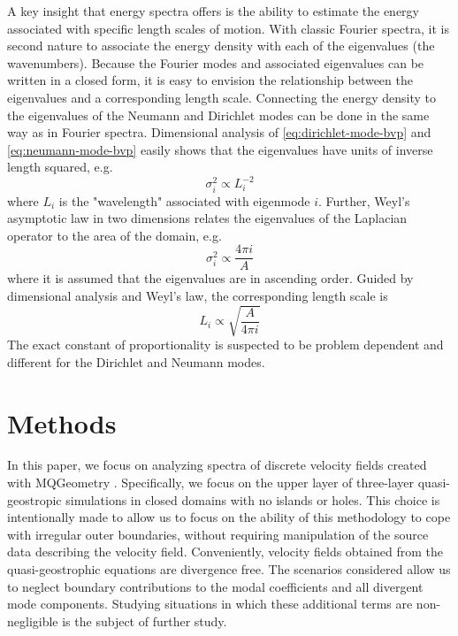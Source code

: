 \documentclass[draft]{agujournal2019}
\begin{document}
A key insight that energy spectra offers is the ability to estimate the energy associated with specific length scales of motion. With classic Fourier spectra, it is second nature to associate the energy density with each of the eigenvalues (the wavenumbers). Because the Fourier modes and associated eigenvalues can be written in a closed form, it is easy to envision the relationship between the eigenvalues and a corresponding length scale. Connecting the energy density to the eigenvalues of the Neumann and Dirichlet modes can be done in the same way as in Fourier spectra. Dimensional analysis of \eqref{eq:dirichlet-mode-bvp} and \eqref{eq:neumann-mode-bvp} easily shows that the eigenvalues have units of inverse length squared, e.g. 
\begin{equation}
    \sigma_i^2 \propto L_i^{-2}
\end{equation}
where $L_i$ is the "wavelength" associated with eigenmode $i$. Further, Weyl's asymptotic law \cite{Weyl1911,Weyl1912,Grebenkov_2013} in two dimensions relates the eigenvalues of the Laplacian operator to the area of the domain, e.g.
\begin{equation}
    \sigma_i^2 \propto \frac{4\pi i}{A}
\end{equation}
where it is assumed that the eigenvalues are in ascending order. Guided by dimensional analysis and Weyl's law, the corresponding length scale is
\begin{equation}
    L_i \propto \sqrt{\frac{A}{4\pi i}}
\end{equation}
The exact constant of proportionality is suspected to be problem dependent and different for the Dirichlet and Neumann modes. 

\section{Methods}
In this paper, we focus on analyzing spectra of discrete velocity fields created with MQGeometry \cite{Thiry2024}. Specifically, we focus on the upper layer of three-layer quasi-geostropic simulations in closed domains with no islands or holes. This choice is intentionally made to allow us to focus on the ability of this methodology to cope with irregular outer boundaries, without requiring manipulation of the source data describing the velocity field. Conveniently, velocity fields obtained from the quasi-geostrophic equations are divergence free. The scenarios considered allow us to neglect boundary contributions to the modal coefficients and all divergent mode components. Studying situations in which these additional terms are non-negligible is the subject of further study.
\end{document}
